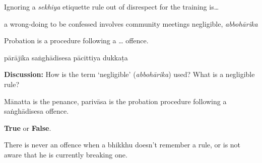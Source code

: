 \begin{exam}{\autoExamName}
\begin{problem*}
\end{problem*}

\problemDivide

\begin{problem*}

  \begin{parts}

  \item Ignoring a \emph{sekhiya} etiquette rule out of disrespect for the
    training is\ldots

    \begin{answers}{4}
      \bChoices
       a wrong-doing\eAns
       to be confessed\eAns
       involves community meetings\eAns
       negligible, \emph{abbohārika}\eAns
      \eChoices
    \end{answers}

  \item Probation is a procedure following a \ldots{} offence.

    \begin{answers}{4}
      \bChoices
       pārājika\eAns
       saṅghādisesa\eAns
       pācittiya\eAns
       dukkaṭa\eAns
      \eChoices
    \end{answers}

  \end{parts}
  
  \bigskip

  \textbf{Discussion:} How is the term `negligible' (\emph{abbohārika}) used? What is a negligible rule?

  \begin{solution}
    Mānatta is the penance, parivāsa is the probation procedure following a saṅghādisesa offence.
  \end{solution}

\end{problem*}


\begin{problem*}

  \textbf{True} or \textbf{False}.

  \bigskip

  \begin{parts}

  \item {} There is never an offence when a bhikkhu doesn't remember a rule,
    or is not aware that he is currently breaking one.

    \bigskip


\end{parts}
\end{problem*}
\end{exam}
